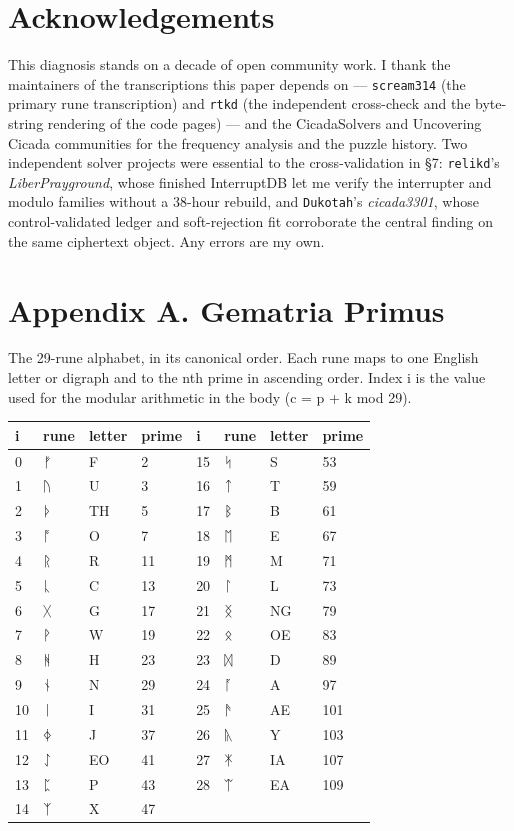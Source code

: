 \documentclass[11pt]{article}
\begin{document}
\section{Acknowledgements}

This diagnosis stands on a decade of open community work. I thank the maintainers of the transcriptions this paper depends on — \texttt{scream314} (the primary rune transcription) and \texttt{rtkd} (the independent cross-check and the byte-string rendering of the code pages) — and the CicadaSolvers and Uncovering Cicada communities for the frequency analysis and the puzzle history. Two independent solver projects were essential to the cross-validation in §7: \texttt{relikd}'s \emph{LiberPrayground}, whose finished InterruptDB let me verify the interrupter and modulo families without a 38-hour rebuild, and \texttt{Dukotah}'s \emph{cicada3301}, whose control-validated ledger and soft-rejection fit corroborate the central finding on the same ciphertext object. Any errors are my own.



\section{Appendix A. Gematria Primus}

The 29-rune alphabet, in its canonical order. Each rune maps to one English letter or digraph and to the nth prime in ascending order. Index i is the value used for the modular arithmetic in the body (c = p + k mod 29).


\begin{center}\begin{tabular}{llllllll}\hline
i & rune & letter & prime & i & rune & letter & prime \\ \hline
0 & ᚠ & F & 2 & 15 & ᛋ & S & 53 \\
1 & ᚢ & U & 3 & 16 & ᛏ & T & 59 \\
2 & ᚦ & TH & 5 & 17 & ᛒ & B & 61 \\
3 & ᚩ & O & 7 & 18 & ᛖ & E & 67 \\
4 & ᚱ & R & 11 & 19 & ᛗ & M & 71 \\
5 & ᚳ & C & 13 & 20 & ᛚ & L & 73 \\
6 & ᚷ & G & 17 & 21 & ᛝ & NG & 79 \\
7 & ᚹ & W & 19 & 22 & ᛟ & OE & 83 \\
8 & ᚻ & H & 23 & 23 & ᛞ & D & 89 \\
9 & ᚾ & N & 29 & 24 & ᚪ & A & 97 \\
10 & ᛁ & I & 31 & 25 & ᚫ & AE & 101 \\
11 & ᛄ & J & 37 & 26 & ᚣ & Y & 103 \\
12 & ᛇ & EO & 41 & 27 & ᛡ & IA & 107 \\
13 & ᛈ & P & 43 & 28 & ᛠ & EA & 109 \\
14 & ᛉ & X & 47 &  &  &  &  \\
\hline\end{tabular}\end{center}
\end{document}

